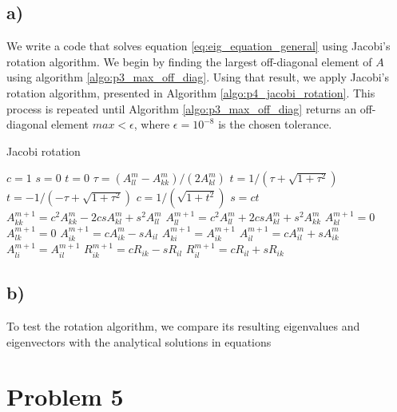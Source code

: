\documentclass[english,notitlepage,nofootinbib]{revtex4-1}  %
\begin{document}
\subsection*{a)}
We write a code that solves equation \eqref{eq:eig_equation_general} using Jacobi's rotation algorithm. We begin by finding the largest off-diagonal element of $A$ using algorithm \ref{algo:p3_max_off_diag}. Using that result, we apply Jacobi's rotation algorithm, presented in Algorithm \ref{algo:p4_jacobi_rotation}. This process is repeated until Algorithm \ref{algo:p3_max_off_diag} returns an off-diagonal element $max < \epsilon$, where $\epsilon=10^{-8}$ is the chosen tolerance. 
\begin{algorithm}[H]
    \caption{Jacobi rotation}\label{algo:p4_jacobi_rotation}
    \begin{algorithmic}
            \State $c=1$
            \State $s=0$
            \State $t=0$
        \Else 
            \State $\tau = (A_{ll}^m-A_{kk}^m) / (2A_{kl}^m)$
                \State $t= 1/(\tau + \sqrt{1+\tau^2})$
            \Else
                \State $t = -1/(-\tau + \sqrt{1+\tau^2})$
            \EndIf
            \State $c=1/(\sqrt{1+t^2})$
            \State $s=ct$
        \EndIf
        \State $A_{kk}^{m+1} = c^2A_{kk}^m - 2csA_{kl}^m + s^2A_{ll}^m$
        \State $A_{ll}^{m+1} = c^2A_{ll}^m + 2csA_{kl}^m + s^2A_{kk}^m$
        \State $A_{kl}^{m+1} = 0$
        \State $A_{lk}^{m+1} = 0$
                \State $A_{ik}^{m+1} = cA_{ik}^m -sA_{il} $
                \State $A_{ki}^{m+1} = A_{ik}^{m+1}$
                \State $A_{il}^{m+1} = cA_{il}^m + sA_{ik}^m$
                \State $A_{li}^{m+1} = A_{il}^{m+1}$
            \EndIf
            \State $R_{ik}^{m+1} = cR_{ik} - sR_{il}$
            \State $R_{il}^{m+1} = cR_{il} + sR_{ik}$
        \EndFor
    \end{algorithmic}
\end{algorithm}
\subsection*{b)}
To test the rotation algorithm, we compare its resulting eigenvalues and eigenvectors with the analytical solutions in equations 


\section*{Problem 5}
\end{document}
